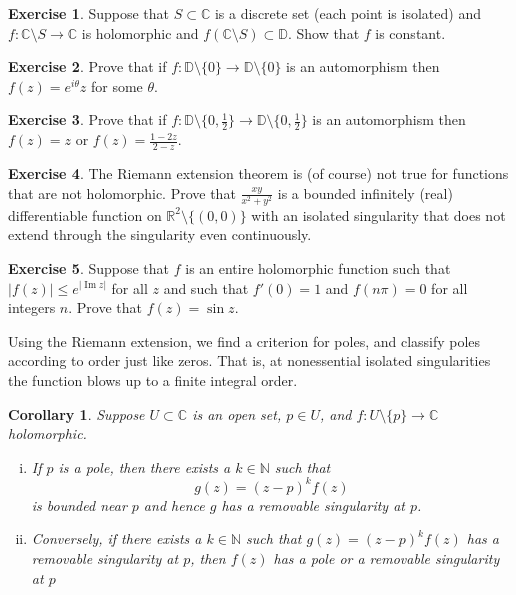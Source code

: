 \documentclass[12pt,openany]{book}
\renewcommand{\Im}{\operatorname{Im}}
\newcommand{\sabs}[1]{\lvert {#1} \rvert}
\newcommand{\C}{{\mathbb{C}}}
\newcommand{\R}{{\mathbb{R}}}
\newcommand{\N}{{\mathbb{N}}}
\newcommand{\D}{{\mathbb{D}}}
\theoremstyle{plain}
\newtheorem{cor}[thm]{Corollary}
\theoremstyle{remark}
\theoremstyle{definition}
\newenvironment{exbox}{%
    \def\FrameCommand{\vrule width 1pt \relax\hspace {10pt}}%
    \MakeFramed {\advance \hsize -\width \FrameRestore }%
}{%
    \endMakeFramed
}
\theoremstyle{exercise}
\newtheorem{exercise}{Exercise}[section]
\theoremstyle{example}
\begin{document}
\begin{exbox}
\begin{exercise}
Suppose that $S \subset \C$ is a discrete set (each point is isolated) and
$f \colon \C \setminus S \to \C$ is holomorphic and $f(\C \setminus S)
\subset \D$.  Show that $f$ is constant.
\end{exercise}

\begin{exercise}
Prove that if $f \colon \D \setminus \{ 0 \} \to \D \setminus \{ 0 \}$
is an automorphism then $f(z) = e^{i\theta} z$ for some $\theta$.
\end{exercise}

\begin{exercise}
Prove that if
$f \colon \D \setminus \bigl\{ 0, \frac{1}{2} \bigr\} \to \D \setminus
\bigl\{ 0 , \frac{1}{2} \bigr\}$
is an automorphism then $f(z) = z$ or $f(z) = \frac{1-2z}{2-z}$.
\end{exercise}

\begin{exercise}
The Riemann extension theorem is (of course) not true for functions that are
not holomorphic.  Prove that $\frac{xy}{x^2+y^2}$ is a bounded infinitely 
(real) differentiable function
on $\R^2 \setminus \{ (0,0) \}$ with an isolated singularity that does not
extend through the singularity even continuously.
\end{exercise}

\begin{exercise}
Suppose that $f$ is an entire holomorphic function such that
$\sabs{f(z)} \leq e^{\sabs{\Im z}}$ for all $z$ and such that
$f'(0) =1$ and $f(n\pi) = 0$ for all integers $n$.
Prove that $f(z) = \sin z$.
\end{exercise}
\end{exbox}

Using the Riemann extension, we find a criterion for poles, and classify
poles according to order just like zeros.  That is,
at nonessential isolated singularities
the function blows up to a finite integral order.

\begin{cor}
Suppose $U \subset \C$ is an open set, $p \in U$,
and $f \colon U \setminus \{p\} \to \C$ holomorphic.
\begin{enumerate}[(i)]
\item
If $p$ is a pole, then there exists a $k \in \N$ such that
\begin{equation*}
g(z) = {(z-p)}^k f(z)
\end{equation*}
is bounded near $p$ and hence $g$ has a removable singularity at $p$.
\item
Conversely, if there exists a $k \in \N$ such that
$g(z) = {(z-p)}^k f(z)$ has a removable singularity at $p$,
then $f(z)$ has a pole or a
removable singularity at $p$
\end{enumerate}
\end{cor}
\end{document}
